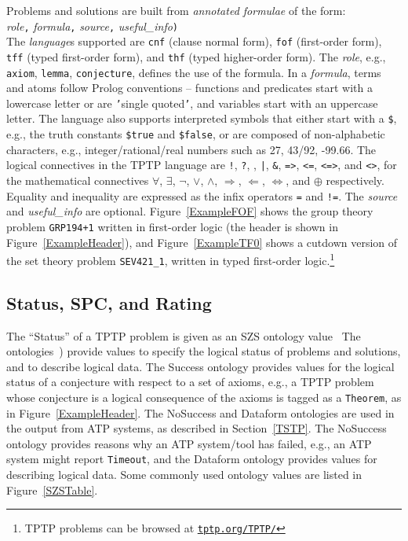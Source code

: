 \documentclass[runningheads]{llncs}
\newcommand{\smalltt}[1]{\small \texttt{#1}}
\begin{document}
Problems and solutions are built from {\em annotated formulae} of the form: \\
{\em role}{\tt ,}
{\em formula}{\tt ,}
{\em source}{\tt ,}
{\em useful\_info}{\tt )}\\
The {\em language}s supported are {\smalltt{cnf}} (clause normal form), {\smalltt{fof}}
(first-order form), {\smalltt{tff}} (typed first-order form), and {\smalltt{thf}}
(typed higher-order form).
The {\em role}, e.g., {\smalltt{axiom}}, {\smalltt{lemma}}, {\smalltt{conjecture}}, defines the 
use of the formula.
In a {\em formula}, terms and atoms follow Prolog conventions -- functions and predicates start 
with a lowercase letter or are {\tt '}single quoted{\tt '}, and variables start with an uppercase 
letter.
The language also supports interpreted symbols that either start with a {\tt \$}, e.g., the 
truth constants {\smalltt{\$true}} and {\smalltt{\$false}}, or are composed of 
non-alphabetic characters, e.g., integer/rational/real numbers such as 27, 43/92, -99.66.
The logical connectives in the TPTP language are
{\tt !}, {\tt ?}, {\tt {\raisebox{0.4ex}{\texttildelow}}}, {\tt |}, {\tt \&}, {\tt =>}, {\tt <=},
{\tt <=>}, and {\tt <{\raisebox{0.4ex}{\texttildelow}}>},
for the mathematical connectives
$\forall$, $\exists$, $\neg$, $\vee$, $\wedge$, $\Rightarrow$, $\Leftarrow$, $\Leftrightarrow$, 
and $\oplus$ respectively.
Equality and inequality are expressed as the infix operators {\tt =} and {\tt !=}.
The {\em source} and {\em useful\_info} are optional.
Figure~\ref{ExampleFOF} shows the group theory problem {\tt GRP194+1} written in first-order logic
(the header is shown in Figure~\ref{ExampleHeader}), and Figure~\ref{ExampleTF0} shows a cutdown 
version of the set theory problem {\tt SEV421\_1}, written in typed first-order logic.\footnote{%
TPTP problems can be browsed at \href{https://tptp.org/TPTP/}{{\tt tptp.org/TPTP/}}}

\subsection{Status, SPC, and Rating}
\label{Characteristics}

The ``Status'' of a TPTP problem is given as an SZS ontology value~\cite{Sut08-KEAPPA}
The ontologies~\cite{SZS03}) provide values to specify the logical status of problems and
solutions, and to describe logical data.
The Success ontology provides values for the logical status of a conjecture with respect to a 
set of axioms, e.g., a TPTP problem whose conjecture is a logical consequence of the axioms 
is tagged as a {\tt Theorem}, as in Figure~\ref{ExampleHeader}.
The NoSuccess and Dataform ontologies are used in the output from ATP systems, as described in
Section~\ref{TSTP}.
The NoSuccess ontology provides reasons why an ATP system/tool has failed, e.g., an ATP system 
might report {\tt Timeout}, and the Dataform ontology provides values for describing logical 
data.
Some commonly used ontology values are listed in Figure~\ref{SZSTable}.
\end{document}
